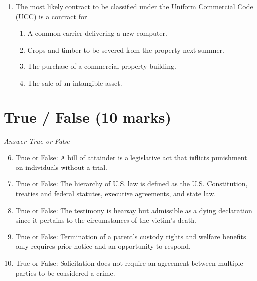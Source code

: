 \documentclass[12pt]{article}
\begin{document}
\begin{enumerate}[label=\arabic*.]
\begin{enumerate}[label=(\alph*)]
    \item Pay just compensation for the property
    \item Terminate the regulation and pay damages that occurred while regulation was in effect
    \item Pay double damages if not addressed in 30 days.
    \item a or b
\end{enumerate}
\item The most likely contract to be classified under the Uniform Commercial Code (UCC) is a contract for
\begin{enumerate}[label=(\alph*)]
    \item A common carrier delivering a new computer.
    \item Crops and timber to be severed from the property next summer.
    \item The purchase of a commercial property building.
    \item The sale of an intangible asset.
\end{enumerate}
\end{enumerate}

\section*{True / False (10 marks)}
\textit{Answer True or False}
\begin{enumerate}[label=\arabic*.]
\setcounter{enumi}{5}
\item True or False: A bill of attainder is a legislative act that inflicts punishment on individuals without a trial.
\item True or False: The hierarchy of U.S. law is defined as the U.S. Constitution, treaties and federal statutes, executive agreements, and state law.
\item True or False: The testimony is hearsay but admissible as a dying declaration since it pertains to the circumstances of the victim's death.
\item True or False: Termination of a parent's custody rights and welfare benefits only requires prior notice and an opportunity to respond.
\item True or False: Solicitation does not require an agreement between multiple parties to be considered a crime.
\end{enumerate}
\end{document}
